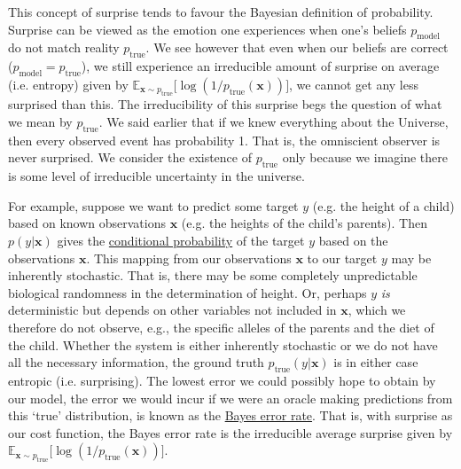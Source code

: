 \documentclass{article}
\begin{document}
This concept of surprise tends to favour the Bayesian definition of probability. Surprise can be viewed as the emotion one experiences when one's beliefs $p_{\mathrm{model}}$ do not match reality $p_{\mathrm{true}}$. We see however that even when our beliefs are correct ($p_{\mathrm{model}} = p_{\mathrm{true}}$), we still experience an irreducible amount of surprise on average (i.e. entropy) given by $\mathbb{E}_{\textbf{x} \sim p_{\mathrm{true}}} \bigr[ \log (1/p_{\mathrm{true}}(\textbf{x})) \bigr]$, we cannot get any less surprised than this. The irreducibility of this surprise begs the question of what we mean by $p_{\mathrm{true}}$. We said earlier that if we knew everything about the Universe, then every observed event has probability 1. That is, the omniscient observer is never surprised. We consider the existence of $p_{\mathrm{true}}$ only because we imagine there is some level of irreducible uncertainty in the universe. 


For example, suppose we want to predict some target $y$ (e.g. the height of a child) based on known observations $\textbf{x}$ (e.g. the heights of the child's parents). Then $p(y|\textbf{x})$ gives the \href{https://en.wikipedia.org/wiki/Conditional_probability}{conditional probability} of the target $y$ based on the observations $\textbf{x}$. This mapping from our observations $\textbf{x}$ to our target $y$ may be inherently stochastic. That is, there may be some completely unpredictable biological randomness in the determination of height. Or, perhaps $y$ \emph{is} deterministic but depends on other variables not included in $\textbf{x}$, which we therefore do not observe, e.g., the specific alleles of the parents and the diet of the child. Whether the system is either inherently stochastic or we do not have all the necessary information, the ground truth  $p_{\mathrm{true}}(y|\textbf{x})$ is in either case entropic (i.e. surprising). The lowest error we could possibly hope to obtain by our model, the error we would incur if we were an oracle making predictions from this `true' distribution, is known as the \href{https://en.wikipedia.org/wiki/Bayes_error_rate}{Bayes error rate}. That is, with surprise as our cost function, the Bayes error rate is the irreducible average surprise given by $\mathbb{E}_{\textbf{x} \sim p_{\mathrm{true}}} \bigr[ \log (1/p_{\mathrm{true}}(\textbf{x})) \bigr]$.
\end{document}
